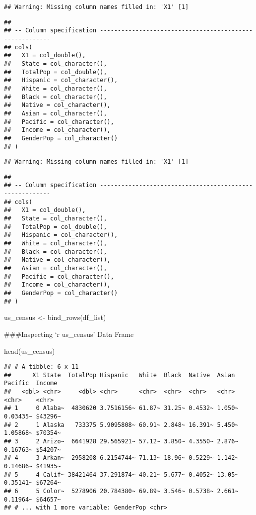 \documentclass[
]{article}
\newenvironment{Shaded}{\begin{snugshade}}{\end{snugshade}}
\newcommand{\FunctionTok}[1]{\textcolor[rgb]{0.00,0.00,0.00}{#1}}
\newcommand{\NormalTok}[1]{#1}
\newcommand{\OtherTok}[1]{\textcolor[rgb]{0.56,0.35,0.01}{#1}}
\begin{document}
\begin{verbatim}
## Warning: Missing column names filled in: 'X1' [1]
\end{verbatim}

\begin{verbatim}
## 
## -- Column specification --------------------------------------------------------
## cols(
##   X1 = col_double(),
##   State = col_character(),
##   TotalPop = col_double(),
##   Hispanic = col_character(),
##   White = col_character(),
##   Black = col_character(),
##   Native = col_character(),
##   Asian = col_character(),
##   Pacific = col_character(),
##   Income = col_character(),
##   GenderPop = col_character()
## )
\end{verbatim}

\begin{verbatim}
## Warning: Missing column names filled in: 'X1' [1]
\end{verbatim}

\begin{verbatim}
## 
## -- Column specification --------------------------------------------------------
## cols(
##   X1 = col_double(),
##   State = col_character(),
##   TotalPop = col_double(),
##   Hispanic = col_character(),
##   White = col_character(),
##   Black = col_character(),
##   Native = col_character(),
##   Asian = col_character(),
##   Pacific = col_character(),
##   Income = col_character(),
##   GenderPop = col_character()
## )
\end{verbatim}

\begin{Shaded}
\begin{Highlighting}[]
\NormalTok{us\_census }\OtherTok{\textless{}{-}} \FunctionTok{bind\_rows}\NormalTok{(df\_list)}
\end{Highlighting}
\end{Shaded}

\#\#\#Inspecting `r us\_census' Data Frame

\begin{Shaded}
\begin{Highlighting}[]
\FunctionTok{head}\NormalTok{(us\_census)}
\end{Highlighting}
\end{Shaded}

\begin{verbatim}
## # A tibble: 6 x 11
##      X1 State  TotalPop Hispanic   White  Black  Native  Asian  Pacific  Income 
##   <dbl> <chr>     <dbl> <chr>      <chr>  <chr>  <chr>   <chr>  <chr>    <chr>  
## 1     0 Alaba~  4830620 3.7516156~ 61.87~ 31.25~ 0.4532~ 1.050~ 0.03435~ $43296~
## 2     1 Alaska   733375 5.9095808~ 60.91~ 2.848~ 16.391~ 5.450~ 1.05868~ $70354~
## 3     2 Arizo~  6641928 29.565921~ 57.12~ 3.850~ 4.3550~ 2.876~ 0.16763~ $54207~
## 4     3 Arkan~  2958208 6.2154744~ 71.13~ 18.96~ 0.5229~ 1.142~ 0.14686~ $41935~
## 5     4 Calif~ 38421464 37.291874~ 40.21~ 5.677~ 0.4052~ 13.05~ 0.35141~ $67264~
## 6     5 Color~  5278906 20.784380~ 69.89~ 3.546~ 0.5738~ 2.661~ 0.11964~ $64657~
## # ... with 1 more variable: GenderPop <chr>
\end{verbatim}
\end{document}
